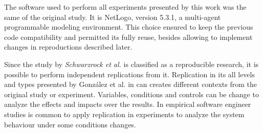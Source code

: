 The software used to perform all experiments presented by this work was the same of the original study\cite{MAS07}. It is NetLogo, version 5.3.1, a multi-agent programmable modeling environment. This choice ensured to keep the previous code compatibility and permitted its fully reuse, besides allowing to implement changes in reproductions described later.



Since the study by \textit{Schwarzrock et al.}\cite{MAS07} is classified as a reproducible research, it is possible to perform independent replications from it. Replication in its all levels and types presented by González et al. in \cite{exp03} can creates different contexts from the original study or experiment. Variables, conditions and controls can be change to analyze the effects and impacts over the results. In empirical software engineer studies is common to apply replication in experiments to analyze the system behaviour under some conditions changes.
